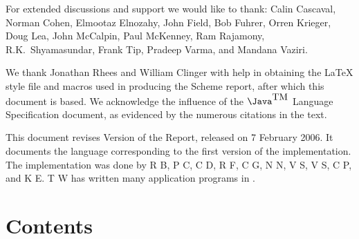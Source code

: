 For extended discussions and support we would like to thank: Calin
Cascaval, Norman Cohen, Elmootaz Elnozahy, John Field, Bob Fuhrer,
Orren Krieger, Doug Lea, John McCalpin, Paul McKenney, Ram Rajamony,
R.K.~Shyamasundar, Frank Tip, Pradeep Varma, and Mandana Vaziri.

We thank Jonathan Rhees and William Clinger with help in
obtaining the \LaTeX{} style file and macros used in producing the
Scheme report, after which this document is based. We acknowledge
the influence of the $\mbox{\Java}^{\mbox{TM}}$ Language Specification \cite{jls2} document,
as evidenced by the numerous citations in the text.

This document revises  Version {} of the Report,
released on 7 February 2006. It documents the language corresponding to
the first version of the implementation.  The implementation was done
by 
R B, 
P C, 
C D, 
R F,
C G,
N N,  
V S,
V S,
C P, and 
K E.
T W has written many application programs in \Xten{}.



\vfill
\eject


\chapter*{Contents}
\addvspace{3.5pt}                  %
\renewcommand{\tocshrink}{-3.5pt}  %
{\footnotesize
\tableofcontents
}

\vfill
\eject


